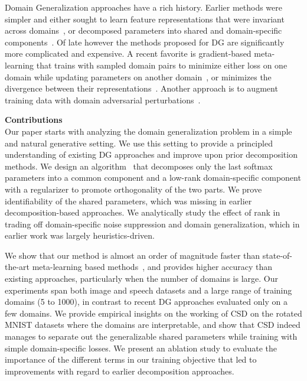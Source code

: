 \documentclass{article}
\begin{document}
Domain Generalization approaches have a rich history. Earlier methods were simpler and either sought to learn feature representations that were invariant across domains~\cite{motiian2017CCSA,MuandetBS13,GhifaryBZB15,WangZZ2019}, or decomposed parameters into shared and domain-specific components~\cite{ECCV12_Khosla,LiYSH17}.  Of late however the methods proposed for DG are significantly more complicated and expensive.  A recent favorite is gradient-based meta-learning that trains with sampled domain pairs to minimize either loss on one domain while updating parameters on another domain~\cite{BalajiSR2018,liYY2018}, or minimizes the divergence between their representations~\cite{DouCK19}.  Another approach is to augment training data with domain adversarial perturbations~\cite{VihariSSS18}. 




\textbf{Contributions}\\
Our paper starts with analyzing the domain generalization problem in a simple and natural generative setting.  We use this setting to provide a principled understanding of existing DG approaches and improve upon prior decomposition methods.  We design an algorithm \mos\ that decomposes only the last softmax parameters into a common component and  a low-rank domain-specific component with a regularizer to promote orthogonality of the two parts.  We prove identifiability of the shared parameters, which was missing in earlier decomposition-based approaches.  We analytically study the effect of rank in trading off domain-specific noise suppression and domain generalization, which in earlier work was largely heuristics-driven.  

We show that our method is almost an order of magnitude faster than state-of-the-art meta-learning based methods~\cite{DouCK19}, and provides higher accuracy than existing approaches, particularly when the number of domains is large.  Our experiments span both image and speech datasets and a large range of training domains (5 to 1000), in contrast to recent DG approaches evaluated only on a few domains.  
We provide empirical insights on the working of CSD on the rotated MNIST datasets where the domains are interpretable, and show that CSD indeed manages to separate out the generalizable shared parameters while training with simple domain-specific losses. We present an ablation study to evaluate the importance of the different terms in our training objective that led to improvements with regard to earlier decomposition approaches.
\end{document}
